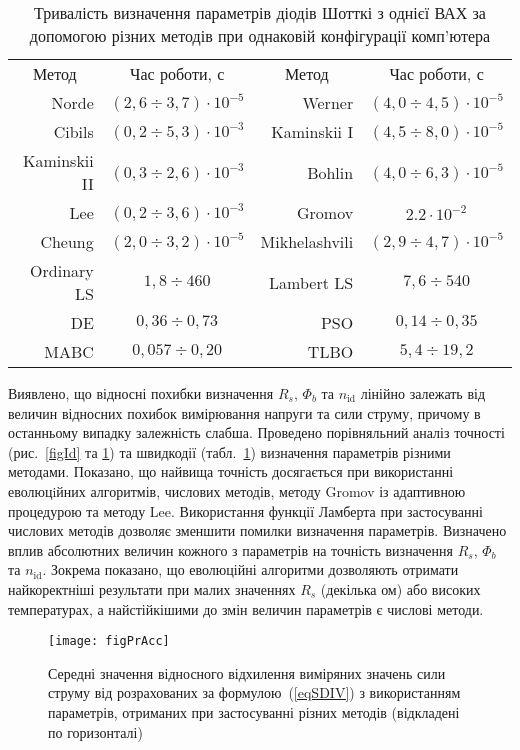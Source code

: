 \begin{table}
\caption{\label{tabRT}Тривалість визначення параметрів діодів Шотткі з однієї ВАХ за допомогою різних методів при однаковій конфігурації комп'ютера}
\centering
\begin{tabular}{|r|c|r|c|}
\hline
\multicolumn{1}{|c|}{Метод}&Час роботи, с &\multicolumn{1}{c|}{Метод}&Час роботи, с\\ \hhline{|====|}
Norde &$(2,6\div3,7)\cdot10^{-5}$& Werner  &$(4,0\div4,5)\cdot10^{-5}$\\ \hline
Cibils  &$(0,2\div5,3)\cdot10^{-3}$& Kaminskii I &$(4,5\div8,0)\cdot10^{-5}$\\ \hline
Kaminskii II &$(0,3\div2,6)\cdot10^{-3}$& Bohlin &$(4,0\div6,3)\cdot10^{-5}$\\ \hline
Lee &$(0,2\div3,6)\cdot10^{-3}$& Gromov &$2.2\cdot10^{-2}$\\ \hline
Cheung &$(2,0\div3,2)\cdot10^{-5}$&Mikhelashvili &$(2,9\div4,7)\cdot10^{-5}$\\ \hline
Ordinary LS &$1,8\div460$&Lambert LS &$7,6\div540$\\ \hline
DE &$0,36\div0,73$&PSO &$0,14\div0,35$\\ \hline
MABC &$0,057\div0,20$&TLBO &$5,4\div19,2$ \\
\hline
\end{tabular}
\end{table}

Виявлено, що
відносні похибки визначення $R_s$, $\Phi_b$ та $n_\mathrm{id}$ лінійно залежать від величин відносних
похибок вимірювання напруги та сили струму, причому в останньому випадку залежність слабша.
Проведено порівняльний аналіз точності (рис.~\ref{figId} та \ref{figPrAcc}) та швидкодії (табл.~\ref{tabRT}) визначення
параметрів різними методами.
Показано, що найвища точність досягається при використанні еволюцiйних алгоритмів, числових методів,
методу Gromov із адаптивною процедурою та методу Lee.
Використання функції Ламберта при застосуванні числових методів дозволяє зменшити помилки визначення параметрів.
Визначено вплив абсолютних величин кожного з параметрів на точність визначення $R_s$, $\Phi_b$ та $n_\mathrm{id}$.
Зокрема показано, що еволюційні алгоритми дозволяють отримати найкоректніші результати при малих
значеннях $R_s$ (декілька ом) або високих температурах, а найстійкішими до змін величин параметрів є числові методи.
\begin{figure}[b]
\center
\texttt{[image: figPrAcc]}%
\caption{\label{figPrAcc}
Середні значення відносного відхилення виміряних значень сили струму
від розрахованих за формулою~(\ref{eqSDIV}) з використанням параметрів, отриманих при застосуванні різних методів (відкладені по горизонталі)
}
\end{figure}






